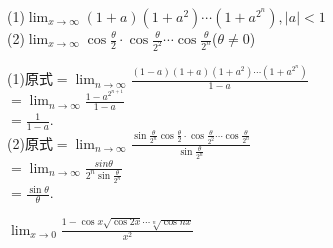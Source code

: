 \begin{example}
	(1)$\lim_{x \to \infty}(1+a)(1+a^2)\cdots (1+a^{2^n}),|a|<1$ \\
	(2)$\lim_{x \to \infty}\cos\frac{\theta}{2}\cdot \cos\frac{\theta}{2^2}\cdots \cos\frac{\theta}{2^n}$($\theta \neq 0$)
	\begin{solution}
		(1)原式$=\lim_{n \to \infty}\frac{(1-a)(1+a)(1+a^2)\cdots (1+a^{2^n})}{1-a}$\\
		$=\lim_{n \to \infty}\frac{1-a^{2^{n+1}}}{1-a}$\\
		$=\frac{1}{1-a}$.\\
		(2)原式$=\lim_{n \to \infty}\frac{\sin \frac{\theta}{2^n}\cos\frac{\theta}{2}\cdot \cos\frac{\theta}{2^2}\cdots \cos\frac{\theta}{2^n}}{\sin \frac{\theta}{2^n}}$\\
		$=\lim_{n \to \infty}\frac{sin \theta}{2^n\sin \frac{\theta}{2^n}}$\\
		$=\frac{\sin \theta}{\theta}$.
	\end{solution}
\end{example}
\begin{example}
	$\lim_{x \to 0}\frac{1-\cos x \sqrt{\cos2x} \cdots \sqrt[n]{\cos nx}}{x^2}$
\end{example}
